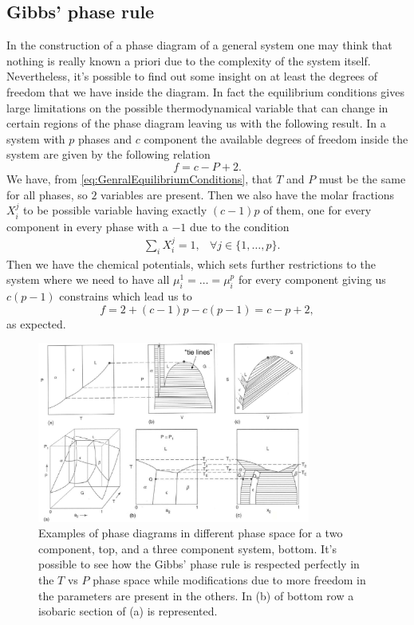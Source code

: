 \subsection{Gibbs' phase rule}

In the construction of a phase diagram of a general system one may think that nothing is really known a priori due to the complexity of the system itself. Nevertheless, it's possible to find out some insight on at least the degrees of freedom that we have inside the diagram. In fact the equilibrium conditions gives large limitations on the possible thermodynamical variable that can change in certain regions of the phase diagram leaving us with the following result.
{
    In a system with $p$ phases and $c$ component the available degrees of freedom inside the system are given by the following relation
    \begin{equation}
        \label{eq:GibbsPhaseRule}
        f = c - P + 2.
    \end{equation}
}
{
    We have, from \eqref{eq:GenralEquilibriumConditions}, that $T$ and $P$ must be the same for all phases, so $2$ variables are present. Then we also have the molar fractions $X_i^j$ to be possible variable having exactly $(c - 1)p$ of them, one for every component in every phase with a $-1$ due to the condition
    \begin{align}
        &\sum_i X^j_i = 1, &\forall j \in \{ 1, \dots, p \}.
    \end{align}
    Then we have the chemical potentials, which sets further restrictions to the system where we need to have all $\mu_i^1 = \dots = \mu_i^p$ for every component giving us $c(p-1)$ constrains which lead us to
    \begin{equation}
        f = 2 + (c-1)p - c(p-1) = c - p + 2,
    \end{equation}
    as expected.
}
\begin{figure}[t]
    \centering
    \includegraphics[width=0.8\textwidth]{Immagini/GeneralPhaseDiag.png}
    \caption
    {
        Examples of phase diagrams in different phase space for a two component, top, and a three component system, bottom. It's possible to see how the Gibbs' phase rule is respected perfectly in the $T$ vs $P$ phase space while modifications due to more freedom in the parameters are present in the others. In (b) of bottom row a isobaric section of (a) is represented.
    }
    \label{fig:GeneralPhaseDiag}
\end{figure}

